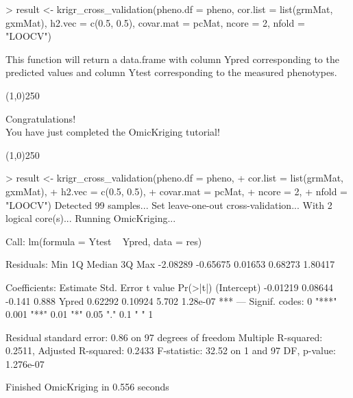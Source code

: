 \documentclass[a4paper]{article}
\begin{document}
\begin{Schunk}
\begin{Sinput}
> result <- krigr_cross_validation(pheno.df = pheno,
	cor.list = list(grmMat, gxmMat),
	h2.vec = c(0.5, 0.5),
	covar.mat = pcMat,
	ncore = 2,
	nfold = "LOOCV")
\end{Sinput}
\end{Schunk}
This function will return a data.frame with column Ypred corresponding to the predicted values and column Ytest corresponding to the measured phenotypes.
\begin{center}
\line(1,0){250}
\end{center}
\begin{center}
Congratulations! 
\\
You have just completed the OmicKriging tutorial!
\end{center}
\begin{center}
\line(1,0){250}
\end{center}
\begin{Schunk}
\begin{Sinput}
> result <- krigr_cross_validation(pheno.df = pheno,
+ cor.list = list(grmMat, gxmMat),
+ h2.vec = c(0.5, 0.5),
+ covar.mat = pcMat,
+ ncore = 2,
+ nfold = "LOOCV")
Detected 99 samples... 
Set leave-one-out cross-validation... 
With 2 logical core(s)... 
Running OmicKriging... 

Call:
lm(formula = Ytest ~ Ypred, data = res)

Residuals:
     Min       1Q   Median       3Q      Max 
-2.08289 -0.65675  0.01653  0.68273  1.80417 

Coefficients:
            Estimate Std. Error t value Pr(>|t|)    
(Intercept) -0.01219    0.08644  -0.141    0.888    
Ypred        0.62292    0.10924   5.702 1.28e-07 ***
---
Signif. codes:  0 "***" 0.001 "**" 0.01 "*" 0.05 "." 0.1 " " 1 

Residual standard error: 0.86 on 97 degrees of freedom
Multiple R-squared: 0.2511,	Adjusted R-squared: 0.2433 
F-statistic: 32.52 on 1 and 97 DF,  p-value: 1.276e-07 

Finished OmicKriging in 0.556 seconds 
\end{Sinput}
\end{Schunk}
\end{document}
